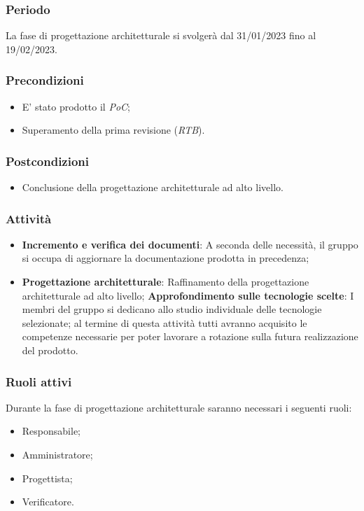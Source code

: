 \subsubsection{Periodo}
La fase di progettazione architetturale si svolgerà dal 31/01/2023 fino al 19/02/2023.

\subsubsection{Precondizioni}
\begin{itemize}
    \item E’ stato prodotto il \textit{PoC};
    \item Superamento della prima revisione (\textit{RTB}).
\end{itemize}

\subsubsection{Postcondizioni}
\begin{itemize}
    \item Conclusione della progettazione architetturale ad alto livello.
\end{itemize}

\subsubsection{Attività}
\begin{itemize}
    \item \textbf{Incremento e verifica dei documenti}: A seconda delle necessità, il gruppo si occupa di aggiornare la documentazione prodotta in precedenza;
    \item \textbf{Progettazione architetturale}: Raffinamento della progettazione architetturale ad alto livello;
        \subitem \textbf{Approfondimento sulle tecnologie scelte}: I membri del gruppo si dedicano allo studio individuale delle tecnologie selezionate; al termine di questa attività tutti avranno acquisito le competenze necessarie per poter lavorare a rotazione sulla futura realizzazione del prodotto.
\end{itemize}

\subsubsection{Ruoli attivi}
Durante la fase di progettazione architetturale saranno necessari i seguenti ruoli:
\begin{itemize}
	\item Responsabile;
    \item Amministratore;
    \item Progettista;
    \item Verificatore.
\end{itemize}

